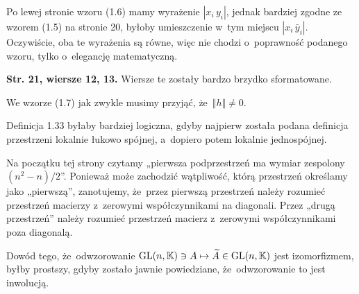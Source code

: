 \documentclass[a4paper,11pt]{article}
\begin{document}
\vspace{\spaceFour}





\start {} Po lewej stronie wzoru (1.6) mamy wyrażenie
$| x_{ i } \, y_{ i } |$, jednak bardziej zgodne ze wzorem (1.5) na stronie 20,
byłoby umieszczenie w~tym miejscu $| x_{ i } \, \bar{y}_{ i } |$. Oczywiście,
oba te wyrażenia są równe, więc nie chodzi o~poprawność podanego wzoru,
tylko o~elegancję matematyczną.

\vspace{\spaceFour}





\start \textbf{Str. 21, wiersze 12, 13.} Wiersze te zostały bardzo brzydko
sformatowane.

\vspace{\spaceFour}





\start {} We wzorze (1.7) jak zwykle musimy przyjąć, że~$\Vert h \Vert \neq 0$.

\vspace{\spaceFour}





\start {} Definicja 1.33 byłaby bardziej logiczna, gdyby najpierw
została podana definicja przestrzeni lokalnie łukowo spójnej, a~dopiero
potem lokalnie jednospójnej.

\vspace{\spaceFour}





\start {} Na początku tej strony czytamy „pierwsza podprzestrzeń ma
wymiar zespolony $( n^{ 2 } - n ) / 2$”. Ponieważ może zachodzić wątpliwość,
którą przestrzeń określamy jako „pierwszą”, zanotujemy, że~przez pierwszą
przestrzeń należy rozumieć przestrzeń macierzy z~zerowymi współczynnikami na
diagonali. Przez „drugą przestrzeń” należy rozumieć przestrzeń macierz
z~zerowymi współczynnikami poza diagonalą.

\vspace{\spaceFour}





\start {} Dowód tego, że~odwzorowanie
$\mathrm{GL}( n, \mathbb{K} ) \ni A \mapsto \widetilde{A} \in \mathrm{GL}( n, \mathbb{K} )$ jest izomorfizmem,
byłby prostszy, gdyby zostało jawnie powiedziane, że~odwzorowanie to jest
inwolucją.
\end{document}
